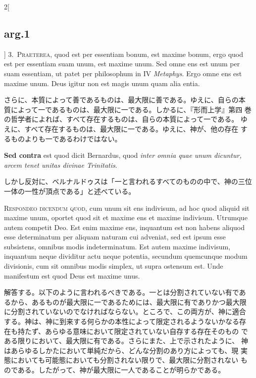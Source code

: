 \documentclass[paper=a4paper,fontsize=10pt,jafontsize=9pt,titlepage]{jlreq}
\begin{document}
\begin{paracol}{2}[\subsection{arg.1}]
3.~{\scshape Praeterea}, quod est per essentiam bonum, est maxime bonum, ergo quod
est per essentiam suam unum, est maxime unum. Sed omne ens est unum per
suam essentiam, ut patet per philosophum in IV {\itshape Metaphys}. Ergo omne ens
est maxime unum. Deus igitur non est magis unum quam alia entia.

\switchcolumn

さらに、本質によって善であるものは、最大限に善である。ゆえに、自らの本
質によって一であるものは、最大限に一である。しかるに、『形而上学』第四
巻の哲学者によれば、すべて存在するものは、自らの本質によって一である。
ゆえに、すべて存在するものは、最大限に一である。ゆえに、神が、他の存在
するものよりも一であるわけではない。

\switchcolumn*

{\bfseries Sed contra} est quod dicit Bernardus, quod {\itshape inter omnia quae unum
 dicuntur, arcem tenet unitas divinae Trinitatis}.

\switchcolumn

しかし反対に、ベルナルドゥスは「一と言われるすべてのものの中で、神の三位
一体の一性が頂点である」と述べている。


{\scshape Respondeo dicendum quod}, cum unum sit ens indivisum, ad hoc quod
aliquid sit maxime unum, oportet quod sit et maxime ens et maxime
indivisum. Utrumque autem competit Deo. Est enim maxime ens, inquantum
est non habens aliquod esse determinatum per aliquam naturam cui
adveniat, sed est ipsum esse subsistens, omnibus modis
indeterminatum. Est autem maxime indivisum, inquantum neque dividitur
actu neque potentia, secundum quemcunque modum divisionis, cum sit
omnibus modis simplex, ut supra ostensum est. Unde manifestum est quod
Deus est maxime unus.

\switchcolumn

解答する。以下のように言われるべきである。一とは分割されていない有であ
るから、あるものが最大限に一であるためには、最大限に有でありかつ最大限
に分割されていないのでなければならない。ところで、この両方が、神に適合
する。神は、神に到来する何らかの本性によって限定されるようないかなる存
 在も持たず、あらゆる意味において限定されていない自存する存在そのもの
である限りにおいて、最大限に有である。さらにまた、上で示されたように、
神はあらゆるしかたにおいて単純だから、どんな分割のあり方によっても、現
実態においても可能態においても分割されない限りで、最大限に分割されない
ものである。したがって、神が最大限に一人であることが明らかである。


\end{paracol}
\end{document}
